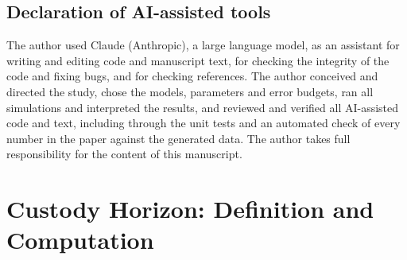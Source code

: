 \documentclass[pdflatex,sn-mathphys-num]{sn-jnl}
\begin{document}
\subsection{Declaration of AI-assisted tools}\label{sec:ai}
The author used Claude (Anthropic), a large language model, as an assistant for writing and editing
code and manuscript text, for checking the integrity of the code and fixing bugs, and for checking
references. The author conceived and directed the study, chose the models, parameters and error
budgets, ran all simulations and interpreted the results, and reviewed and verified all AI-assisted
code and text, including through the unit tests and an automated check of every number in the paper
against the generated data. The author takes full responsibility for the content of this manuscript.

\section{Custody Horizon: Definition and Computation}\label{sec:custody-def}
\end{document}
